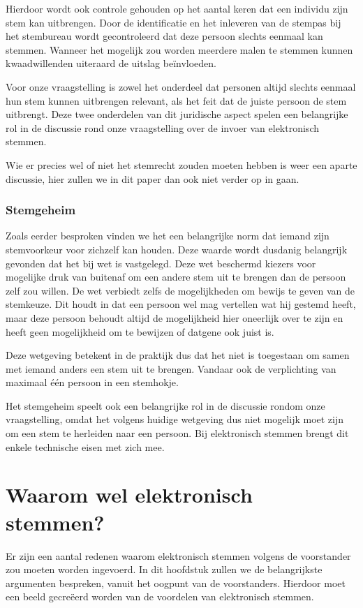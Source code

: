 \documentclass[a4paper]{article}
\begin{document}
Hierdoor wordt ook controle gehouden op het aantal keren dat een individu zijn stem kan uitbrengen.
Door de identificatie en het inleveren van de stempas bij het stembureau wordt gecontroleerd dat deze persoon slechts eenmaal kan stemmen.
Wanneer het mogelijk zou worden meerdere malen te stemmen kunnen kwaadwillenden uiteraard de uitslag beïnvloeden.

Voor onze vraagstelling is zowel het onderdeel dat personen altijd slechts eenmaal hun stem kunnen uitbrengen relevant, als het feit dat de juiste persoon de stem uitbrengt. 
Deze twee onderdelen van dit juridische aspect spelen een belangrijke rol in de discussie rond onze vraagstelling over de invoer van elektronisch stemmen.

Wie er precies wel of niet het stemrecht zouden moeten hebben is weer een aparte discussie, hier zullen we in dit paper dan ook niet verder op in gaan.

\subsubsection{Stemgeheim}
Zoals eerder besproken vinden we het een belangrijke norm dat iemand zijn stemvoorkeur voor zichzelf kan houden.
Deze waarde wordt dusdanig belangrijk gevonden dat het bij wet is vastgelegd.
Deze wet beschermd kiezers voor mogelijke druk van buitenaf om een andere stem uit te brengen dan de persoon zelf zou willen.
De wet verbiedt zelfs de mogelijkheden om bewijs te geven van de stemkeuze.
Dit houdt in dat een persoon wel mag vertellen wat hij gestemd heeft, maar deze persoon behoudt altijd de mogelijkheid hier oneerlijk over te zijn en heeft geen mogelijkheid om te bewijzen of datgene ook juist is.

Deze wetgeving betekent in de praktijk dus dat het niet is toegestaan om samen met iemand anders een stem uit te brengen.
Vandaar ook de verplichting van maximaal {\'e}{\'e}n persoon in een stemhokje.

Het stemgeheim speelt ook een belangrijke rol in de discussie rondom onze vraagstelling, omdat het volgens huidige wetgeving dus niet mogelijk moet zijn om een stem te herleiden naar een persoon.
Bij elektronisch stemmen brengt dit enkele technische eisen met zich mee.

\newpage

\section{Waarom wel elektronisch stemmen?}
Er zijn een aantal redenen waarom elektronisch stemmen volgens de voorstander zou moeten worden ingevoerd.
In dit hoofdstuk zullen we de belangrijkste argumenten bespreken, vanuit het oogpunt van de voorstanders.
Hierdoor moet een beeld gecre{\"e}erd worden van de voordelen van elektronisch stemmen.
\end{document}
